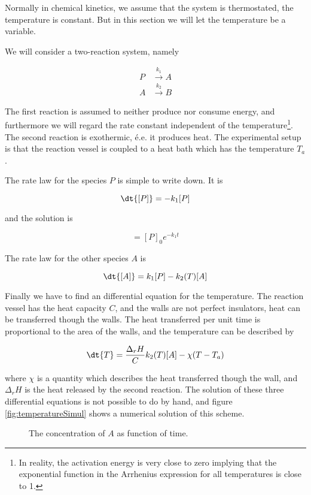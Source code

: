 Normally in chemical kinetics, we assume that the system is thermostated, \ie the temperature is constant. But in this section we will let the temperature be a variable.

We will consider a two-reaction system, namely

\begin{align*}
    P &\overset{k_1}{\rightarrow} A \\
    A &\overset{k_2}{\rightarrow} B
\end{align*}

The first reaction is assumed to neither produce nor consume energy, and furthermore we will regard the rate constant independent of the temperature\footnote{In reality, the activation energy is very close to zero implying that the exponential function in the Arrhenius expression for all temperatures is close to 1.}. The second reaction is exothermic, é.e. it produces heat. The experimental  setup is that the reaction vessel is coupled to a heat bath which has the temperature $T_a$.

The rate law for the species $P$ is simple to write down. It is

\[
    \dt{[P]} = -k_1[P]
\]

and the solution is

\begin{equation}
    [P] = [P]_0 e^{-k_1t}
\end{equation}

The rate law for the other species $A$ is

\begin{equation}
    \dt{[A]} = k_1[P] -k_2(T)[A]
\end{equation}

Finally we have to find an differential equation for the temperature. The reaction vessel has the heat capacity $C$, and the walls are not perfect insulators, \ie heat can be transferred though the walls. The heat transferred per unit time is proportional to the area of the walls, and the temperature can be described by

\begin{equation}
    \dt{T} = \frac{\Delta_r H}{C} k_2(T)[A] - \chi (T-T_a)
\end{equation}

where $\chi$ is a quantity which describes the heat transferred though the wall, and $\Delta_r H$ is the heat released by the second reaction. The solution of these three differential equations is not possible to do by hand, and figure \ref{fig:temperatureSimul} shows a numerical solution of this scheme.

\begin{figure}
    \caption{The concentration of $A$ as function of time.\label{fig}}
\end{figure}